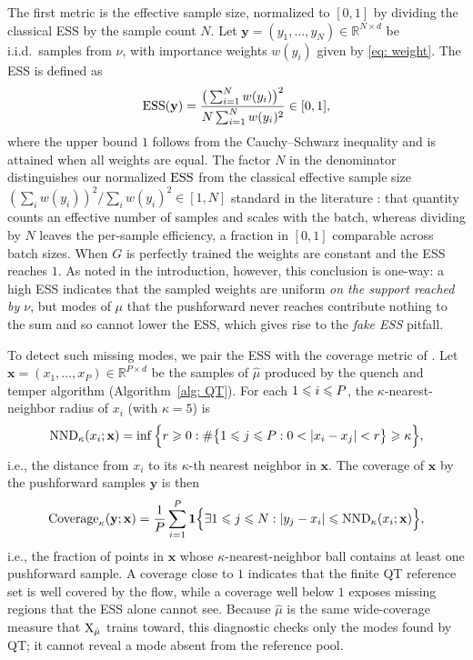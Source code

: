 \documentclass{article}
\begin{document}
The first metric is the effective sample size, normalized to $[0,1]$ by dividing the classical ESS by the sample count $N$. Let $\mathbf y = (y_1,\dots,y_N) \in \mathbb R^{N\times d}$ be i.i.d.\ samples from $\nu$, with importance weights $w(y_i)$ given by \eqref{eq: weight}. The ESS is defined as
\begin{equation}
    \mathrm{ESS}(\mathbf y) = \frac{\big(\sum_{i=1}^N w(y_i)\big)^2}{N \sum_{i=1}^N w(y_i)^2} \in [0,1],
\end{equation}
where the upper bound $1$ follows from the Cauchy--Schwarz inequality and is attained when all weights are equal. The factor $N$ in the denominator distinguishes our normalized $\mathrm{ESS}$ from the classical effective sample size $(\sum_i w(y_i))^2 / \sum_i w(y_i)^2 \in [1, N]$ standard in the literature \citep{martino2017rethinking}: that quantity counts an effective number of samples and scales with the batch, whereas dividing by $N$ leaves the per-sample efficiency, a fraction in $[0,1]$ comparable across batch sizes. When $G$ is perfectly trained the weights are constant and the ESS reaches $1$. As noted in the introduction, however, this conclusion is one-way: a high ESS indicates that the sampled weights are uniform \emph{on the support reached by $\nu$}, but modes of $\mu$ that the pushforward never reaches contribute nothing to the sum and so cannot lower the ESS, which gives rise to the \emph{fake ESS} pitfall.

To detect such missing modes, we pair the ESS with the coverage metric of \citet{naeem2020reliable}. Let $\mathbf x = (x_1,\dots,x_P) \in \mathbb R^{P\times d}$ be the samples of $\hat\mu$ produced by the quench and temper algorithm (Algorithm~\ref{alg: QT}). For each $1 \leqslant i \leqslant P$, the $\kappa$-nearest-neighbor radius of $x_i$ (with $\kappa = 5$) is
\begin{equation}
    \mathrm{NND}_\kappa(x_i;\mathbf x) = \inf\Big\{ r \geqslant 0 :
    \# \big\{1\leqslant j \leqslant P: 0 < |x_i - x_j| < r\big\} \geqslant \kappa
    \Big\},
\end{equation}
i.e., the distance from $x_i$ to its $\kappa$-th nearest neighbor in $\mathbf x$. The coverage of $\mathbf x$ by the pushforward samples $\mathbf y$ is then
\begin{equation}
    \mathrm{Coverage}_\kappa(\mathbf y;\mathbf x) =
    \frac{1}{P} \sum_{i=1}^P \mathbf 1\Bigl\{
        \exists  1\leqslant j\leqslant N : |y_j - x_i| \leqslant \mathrm{NND}_\kappa(x_i;\mathbf x)
    \Bigr\},
\end{equation}
i.e., the fraction of points in $\mathbf x$ whose $\kappa$-nearest-neighbor ball contains at least one pushforward sample. A coverage close to $1$ indicates that the finite QT reference set is well covered by the flow, while a coverage well below $1$ exposes missing regions that the ESS alone cannot see. Because $\hat\mu$ is the same wide-coverage measure that $\mathrm{X}_{\hat\mu}$ trains toward, this diagnostic checks only the modes found by QT; it cannot reveal a mode absent from the reference pool.
\end{document}
